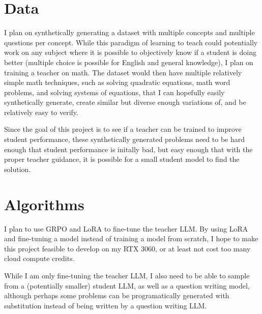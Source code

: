 \documentclass{article}
\begin{document}
\section{Data}
I plan on synthetically generating a dataset with multiple concepts and multiple questions per concept.
While this paradigm of learning to teach could potentially work on any subject where it is possible to
objectively know if a student is doing better (multiple choice is possible for English and general knowledge),
I plan on training a teacher on math. The dataset would then have multiple relatively simple math techniques,
such as solving quadratic equations, math word problems, and solving systems of equations, that I can hopefully
easily synthetically generate, create similar but diverse enough variations of, and be relatively easy to verify.

Since the goal of this project is to see if a teacher can be trained to improve student performance,
these synthetically generated problems need to be hard enough that student performance is initally bad,
but easy enough that with the proper teacher guidance, it is possible for a small student model to find
the solution.

\section{Algorithms}
I plan to use GRPO and LoRA to fine-tune the teacher LLM. By using LoRA and fine-tuning a model instead
of training a model from scratch, I hope to make this project feasible to develop on my RTX 3060, or
at least not cost too many cloud compute credits.

While I am only fine-tuning the teacher LLM, I also need to be able to sample from a (potentially smaller)
student LLM, as well as a question writing model, although perhaps some problems can be programatically
generated with substitution instead of being written by a question writing LLM.
\end{document}
